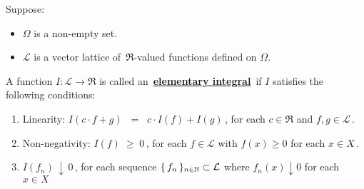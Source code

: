 
\begin{definition}
\mbox{}\vskip 0.1cm
\noindent
Suppose:
\begin{itemize}
\item
	$\Omega$ is a non-empty set.
\item
	$\mathcal{L}$ is a vector lattice of \,$\Re$-valued functions defined on $\Omega$.
\end{itemize}
A function $I : \mathcal{L} \longrightarrow \Re$ is called an \,\underline{\textbf{elementary integral}}\,
if $I$ satisfies the following conditions:
\begin{enumerate}
\item
	Linearity:\;\;
	$I(c \cdot f + g) \;\; = \;\; c \cdot I(f) + I(g)$\,,
	for each $c \in \Re$ and $f, g \in \mathcal{L}$\,.
\item
	Non-negativity:\;\; $I(f) \; \geq \; 0$\,,\;\;
	for each $f \in \mathcal{L}$ with $f(x) \geq 0$ for each $x \in X$\,.
\item
	$I(f_{n}) \, \downarrow \, 0$\,,
	for each sequence $\{\,f_{n}\,\}_{n\in\mathbb{N}} \subset \mathcal{L}$ where $f_{n}(x) \downarrow 0$ for each $x \in X$
\end{enumerate}
\end{definition}


